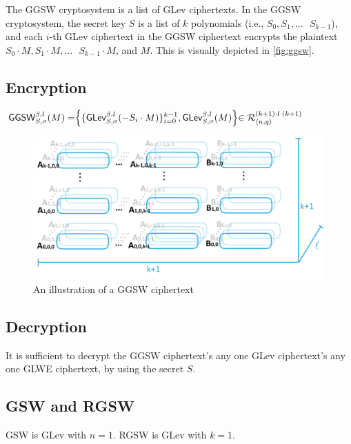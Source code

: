 The GGSW cryptosystem is a list of GLev ciphertexts. In the GGSW cryptosystem, the secret key $S$ is a list of $k$ polynomials (i.e., $S_0, S_1, ... \text{ } S_{k-1}$), and each $i$-th GLev ciphertext in the GGSW ciphertext encrypts the plaintext $S_0 \cdot M, S_1 \cdot M, ... \text{ } S_{k-1} \cdot M$, and $M$. This is visually depicted in \autoref{fig:ggsw}.


\subsection{Encryption}
\label{subsec:ggsw-enc}

\begin{tcolorbox}[title={\textbf{\tboxlabel{\ref*{subsec:ggsw-enc}} GGSW Encryption}}]
$\textsf{GGSW}_{S, \sigma}^{\beta, l}(M) = \Bigr \{ \{ \textsf{GLev}_{S, \sigma}^{\beta, l}(-S_i \cdot M)  \}_{i=0}^{k-1}, \textsf{GLev}_{S, \sigma}^{\beta, l}(M) \Bigl \} \in \mathcal{R}_{\langle n, q \rangle }^{(k+1) \cdot l \cdot (k+1)}$
\end{tcolorbox}

\begin{figure}[h!]
    \centering
  \includegraphics[width=1.0\linewidth]{figures/TFHE-fig3.pdf}
  \caption{An illustration of a GGSW ciphertext}
  \label{fig:ggsw}
\end{figure}


\subsection{Decryption}

It is sufficient to decrypt the GGSW ciphertext's any one GLev ciphertext's any one GLWE ciphertext, by using the secret $S$.



\subsection{GSW and RGSW}

GSW is GLev with $n=1$. RGSW is GLev with $k=1$.